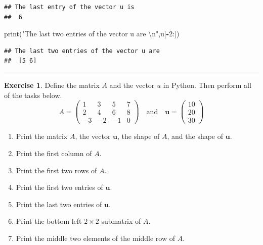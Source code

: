 \documentclass[
]{book}
\newenvironment{Shaded}{\begin{snugshade}}{\end{snugshade}}
\newcommand{\BuiltInTok}[1]{#1}
\newcommand{\CharTok}[1]{\textcolor[rgb]{0.31,0.60,0.02}{#1}}
\newcommand{\DecValTok}[1]{\textcolor[rgb]{0.00,0.00,0.81}{#1}}
\newcommand{\NormalTok}[1]{#1}
\newcommand{\OperatorTok}[1]{\textcolor[rgb]{0.81,0.36,0.00}{\textbf{#1}}}
\newcommand{\StringTok}[1]{\textcolor[rgb]{0.31,0.60,0.02}{#1}}
\providecommand{\tightlist}{%
  \setlength{\itemsep}{0pt}\setlength{\parskip}{0pt}}
\theoremstyle{definition}
\theoremstyle{definition}
\theoremstyle{definition}
\newtheorem{exercise}{Exercise}[chapter]
\theoremstyle{remark}
\begin{document}
\begin{verbatim}
## The last entry of the vector u is 
##  6
\end{verbatim}

\begin{Shaded}
\begin{Highlighting}[]
\BuiltInTok{print}\NormalTok{(}\StringTok{"The last two entries of the vector u are }\CharTok{\textbackslash{}n}\StringTok{"}\NormalTok{,u[}\OperatorTok{{-}}\DecValTok{2}\NormalTok{:])}
\end{Highlighting}
\end{Shaded}

\begin{verbatim}
## The last two entries of the vector u are 
##  [5 6]
\end{verbatim}

\begin{center}\rule{0.5\linewidth}{0.5pt}\end{center}

\begin{exercise}
\protect\hypertarget{exr:unnamed-chunk-287}{}{\label{exr:unnamed-chunk-287} }Define the matrix \(A\) and the vector \(u\) in Python. Then perform all of the tasks below.
\[ A = \begin{pmatrix} 1 & 3 & 5 & 7 \\ 2 & 4 & 6 & 8 \\ -3 & -2 & -1 & 0 \end{pmatrix} \quad \text{and} \quad \boldsymbol{u} = \begin{pmatrix} 10\\20\\30 \end{pmatrix} \]

\begin{enumerate}
\def\labelenumi{\alph{enumi}.}
\tightlist
\item
  Print the matrix \(A\), the vector \(\boldsymbol{u}\), the shape of \(A\), and the shape of \(\boldsymbol{u}\).
\item
  Print the first column of \(A\).
\item
  Print the first two rows of \(A\).
\item
  Print the first two entries of \(\boldsymbol{u}\).
\item
  Print the last two entries of \(\boldsymbol{u}\).
\item
  Print the bottom left \(2 \times 2\) submatrix of \(A\).
\item
  Print the middle two elements of the middle row of \(A\).
\end{enumerate}
\end{exercise}
\end{document}
